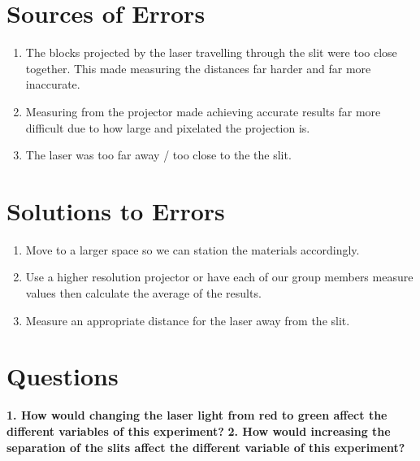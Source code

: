 \documentclass{article}
\begin{document}
\section*{Sources of Errors} {
    \begin{enumerate}
        \item {The blocks projected by the laser travelling through the slit were too close together. This made measuring the distances far harder and far more inaccurate.}
        \item {Measuring from the projector made achieving accurate results far more difficult due to how large and pixelated the projection is.}
        \item {The laser was too far away / too close to the the slit.}
    \end{enumerate}
}
\section*{Solutions to Errors} {
    \begin{enumerate}
        \item {Move to a larger space so we can station the materials accordingly.}
        \item {Use a higher resolution projector or have each of our group members measure values then calculate the average of the results.}
        \item {Measure an appropriate distance for the laser away from the slit.}
    \end{enumerate}\leavevmode
}
\section*{Questions} {
    \textbf{1. How would changing the laser light from red to green affect the different variables of this experiment?}
    \textbf{2. How would increasing the separation of the slits affect the different variable of this experiment?}
}
\end{document}
